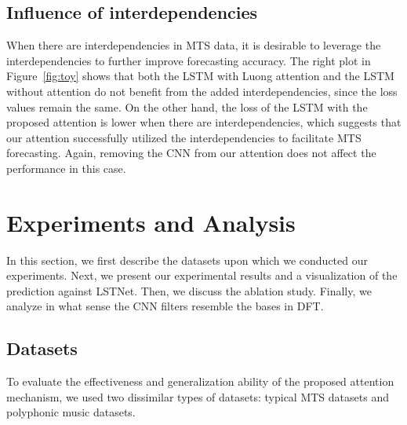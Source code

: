 \subsection{Influence of interdependencies}
When there are interdependencies in MTS data, it is desirable to leverage the interdependencies to further improve forecasting accuracy.
The right plot in Figure~\ref{fig:toy} shows that both the LSTM with Luong attention and the LSTM without attention do not benefit from the added interdependencies, since the loss values remain the same.
On the other hand, the loss of the LSTM with the proposed attention is lower when there are interdependencies, which suggests that our attention successfully utilized the interdependencies to facilitate MTS forecasting.
Again, removing the CNN from our attention does not affect the performance in this case.



\section{Experiments and Analysis}\label{sec:experiments_and_analysis}

In this section, we first describe the datasets upon which we conducted our experiments.
Next, we present our experimental results and a visualization of the prediction against LSTNet.
Then, we discuss the ablation study.
Finally, we analyze in what sense the CNN filters resemble the bases in DFT.

\subsection{Datasets}
To evaluate the effectiveness and generalization ability of the proposed attention mechanism, we used two dissimilar types of datasets: typical MTS datasets and polyphonic music datasets.

